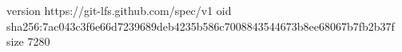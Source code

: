 version https://git-lfs.github.com/spec/v1
oid sha256:7ac043c3f6e66d7239689deb4235b586c7008843544673b8ee68067b7fb2b37f
size 7280
